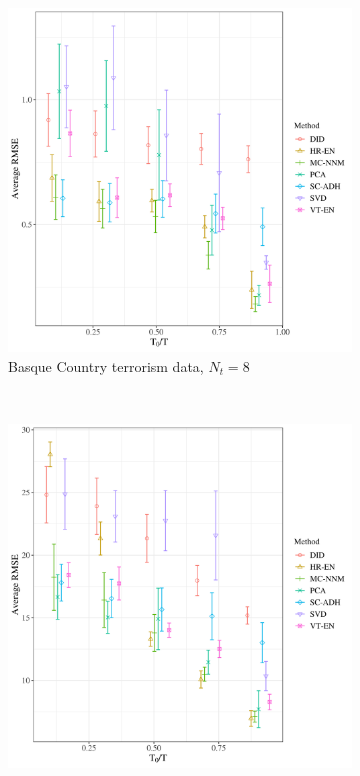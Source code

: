 \documentclass[12pt]{article}
\begin{document}
\begin{figure}[htbp]
	\centering
	\begin{subfigure}[t]{0.45\textwidth}
		\centering
		\includegraphics[width=\textwidth]{plots/basque_N_16_T_43_numruns_20_num_treated_8_simultaneuous_0.png}
		\caption{Basque Country terrorism data, $N_t = 8$} 
	\end{subfigure}
	~ 
	\begin{subfigure}[t]{0.45\textwidth}
		\centering
		\includegraphics[width=\textwidth]{plots/california_N_38_T_31_numruns_20_num_treated_19_simultaneuous_0.png}

\end{subfigure}
\end{figure}
\end{document}
